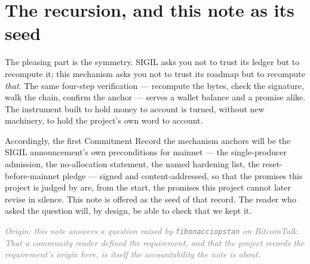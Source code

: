 \documentclass[10pt,a4paper]{article}
\begin{document}
\section{The recursion, and this note as its seed}
The pleasing part is the symmetry. SIGIL asks you not to trust its ledger but to
recompute it; this mechanism asks you not to trust its roadmap but to recompute
\emph{that}. The same four-step verification --- recompute the bytes, check the
signature, walk the chain, confirm the anchor --- serves a wallet balance and a
promise alike. The instrument built to hold money to account is turned, without new
machinery, to hold the project's own word to account.

Accordingly, the first Commitment Record the mechanism anchors will be the SIGIL
announcement's own preconditions for mainnet --- the single-producer admission, the
no-allocation statement, the named hardening list, the reset-before-mainnet pledge ---
signed and content-addressed, so that the promises this project is judged by are, from
the start, the promises this project cannot later revise in silence. This note is
offered as the seed of that record. The reader who asked the question will, by design,
be able to check that we kept it.

\vspace{8pt}
\begin{center}\small\itshape\textcolor{gray}{%
Origin: this note answers a question raised by \texttt{fibonacciopstan} on
BitcoinTalk. That a community reader defined the requirement, and that the project
records the requirement's origin here, is itself the accountability the note is about.}
\end{center}
\end{document}
